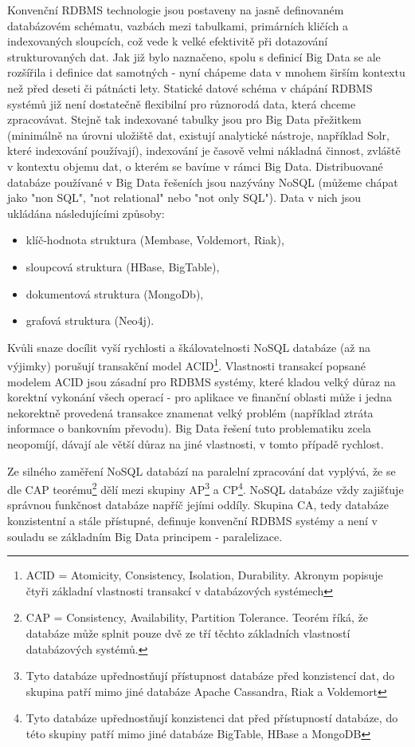 \documentclass[11pt,twoside,a4paper]{book}
\begin{document}
		Konvenční RDBMS technologie jsou postaveny na jasně definovaném databázovém schématu, vazbách mezi tabulkami, primárních kličích a indexovaných sloupcích, což vede k velké efektivitě při dotazování strukturovaných dat. Jak již bylo naznačeno, spolu s definicí Big Data se ale rozšířila i definice dat samotných - nyní chápeme data v mnohem širším kontextu než před deseti či pátnácti lety. Statické datové schéma v chápání RDBMS systémů již není dostatečně flexibilní pro různorodá data, která chceme zpracovávat. Stejně tak indexované tabulky jsou pro Big Data přežitkem (minimálně na úrovni uložiště dat, existují analytické nástroje, například Solr, které indexování používají), indexování je časově velmi nákladná činnost, zvláště v kontextu objemu dat, o kterém se bavíme v rámci Big Data. Distribuované databáze používané v Big Data řešeních jsou nazývány NoSQL (můžeme chápat jako "non SQL", "not relational" nebo "not only SQL"). Data v nich jsou ukládána následujícími způsoby: 
\begin{itemize}  
\item klíč-hodnota struktura (Membase, Voldemort, Riak),
\item sloupcová struktura (HBase, BigTable), 
\item dokumentová struktura (MongoDb),
\item grafová struktura (Neo4j).
\end{itemize}
		
		 Kvůli snaze docílit vyší rychlosti  a škálovatelnosti NoSQL databáze (až na výjimky) porušují transakční model ACID\footnote{ACID = Atomicity, Consistency, Isolation, Durability. Akronym popisuje čtyři základní vlastnosti transakcí v databázových systémech}. Vlastnosti transakcí popsané modelem ACID jsou zásadní pro RDBMS systémy, které kladou velký důraz na korektní vykonání všech operací - pro aplikace ve finanční oblasti může i jedna nekorektně provedená transakce znamenat velký problém (například ztráta informace o bankovním převodu). Big Data řešení tuto problematiku zcela neopomíjí, dávají ale větší důraz na jiné vlastnosti, v tomto případě rychlost.   
 		
		Ze silného zaměření NoSQL databází na paralelní zpracování dat vyplývá, že  se dle CAP teorému\footnote{CAP = Consistency, Availability, Partition Tolerance. Teorém říká, že databáze může splnit pouze dvě ze tří těchto základních vlastností databázových systémů.}  dělí mezi skupiny AP\footnote{Tyto databáze upřednostňují přístupnost databáze před konzistencí dat, do skupina patří mimo jiné databáze Apache Cassandra, Riak a Voldemort} a  CP\footnote{Tyto databáze upřednostňují konzistenci dat před přístupností databáze, do této skupiny patří mimo jiné databáze BigTable, HBase a MongoDB}. NoSQL databáze vždy zajišťuje správnou funkčnost databáze napříč jejími oddíly. Skupina CA, tedy databáze konzistentní a stále přístupné, definuje konvenční RDBMS systémy a není v souladu se základním Big Data principem - paralelizace. 
		   
\end{document}
